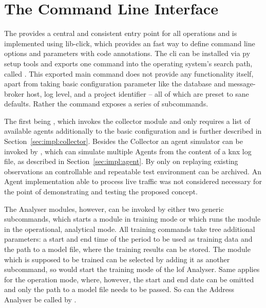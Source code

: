 \section{The Command Line Interface}
\label{sec:impl:cli}

\begin{comment}
\begin{itemize}
	\item central entry point for all operations
	\item consistent user experience -> less fiddling while debugging/developing
	\item centralises configuration and log setup
	\item can be easily made accessible via python setuptools
		\subitem if globally installed, callable via normal terminal command
	\item implemented using the \gls{lib-click} library version 6
\end{itemize}
\end{comment}

The  provides a central and consistent entry point for all operations and is implemented using \gls{lib-click}, which provides an fast way to define command line options and parameters with code annotations.
The \gls{cli} can be installed via \gls{py} setup tools and exports one command into the operating system's search path, called .
This exported main command does not provide any functionality itself, apart from taking basic configuration parameter like the database and message-broker host, log level, and a project identifier -- all of which are preset to sane defaults.
Rather the command exposes a series of subcommands.

The first being , which invokes the collector module and only requires a list of available agents additionally to the basic configuration and is further described in Section~\ref{sec:impl:collector}.
Besides the Collector an agent simulator can be invoked by , which can simulate multiple Agents from the content of a \gls{knx} log file, as described in Section~\ref{sec:impl:agent}.
By only on replaying existing observations an controllable and repeatable test environment can be archived. An Agent implementation able to process live traffic was not considered necessary for the point of demonstrating and testing the proposed concept.

The Analyser modules, however, can be invoked by either two generic subcommands,  which starts a module in training mode or  which runs the module in the operational, analytical mode.
All training commands take tree additional parameters: a start and end time of the period to be used as training data and the path to a model file, where the training results can be stored. The module which is supposed to be trained can be selected by adding it as another subcommand, so would  start the training mode of the \gls{lof} Analyser.
Same applies for the operation mode, where, however, the start and end date can be omitted and only the path to a model file needs to be passed. So can the Address Analyser be called by .

